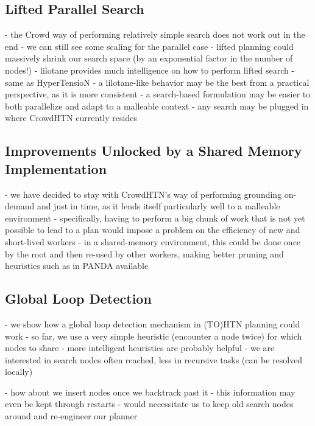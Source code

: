 \subsection{Lifted Parallel Search}
- the Crowd way of performing relatively simple search does not work out in the end
- we can still see some scaling for the parallel case
- lifted planning could massively shrink our search space (by an exponential factor in the number of nodes!)
- lilotane provides much intelligence on how to perform lifted search
- same as HyperTensioN
- a lilotane-like behavior may be the best from a practical perspective, as it is more consistent
- a search-based formulation may be easier to both parallelize and adapt to a malleable context - any search may be plugged in where CrowdHTN currently resides

\subsection{Improvements Unlocked by a Shared Memory Implementation}
- we have decided to stay with CrowdHTN's way of performing grounding on-demand and just in time, as it lends itself particularly well to a malleable environment
- specifically, having to perform a big chunk of work that is not yet possible to lead to a plan would impose a problem on the efficiency of new and short-lived workers
- in a shared-memory environment, this could be done once by the root and then re-used by other workers, making better pruning and heuristics such as in PANDA available

\subsection{Global Loop Detection}
- we show how a global loop detection mechanism in (TO)HTN planning could work
- so far, we use a very simple heuristic (encounter a node twice) for which nodes to share
- more intelligent heuristics are probably helpful
- we are interested in search nodes often reached, less in recursive tasks (can be resolved locally)

- how about we insert nodes once we backtrack past it
	- this information may even be kept through restarts
	- would necessitate us to keep old search nodes around and re-engineer our planner

